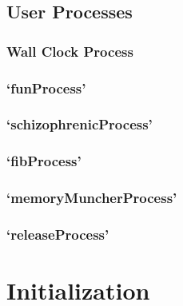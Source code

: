 \documentclass[12pt]{report}
\begin{document}
\section{User Processes}
\label{sec:user_processes}

\subsection{Wall Clock Process}
\label{sec:wall_clock_process}

\subsection{`funProcess'}

\subsection{`schizophrenicProcess'}

\subsection{`fibProcess'}

\subsection{`memoryMuncherProcess'}

\subsection{`releaseProcess'}



\chapter{Initialization}
\end{document}
